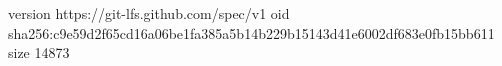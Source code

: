 version https://git-lfs.github.com/spec/v1
oid sha256:c9e59d2f65cd16a06be1fa385a5b14b229b15143d41e6002df683e0fb15bb611
size 14873
